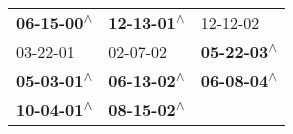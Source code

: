 \begin{supertabular}{lll}
 \textbf{06-15-00\textsuperscript{$\wedge$}} &  \textbf{12-13-01\textsuperscript{$\wedge$}} &                   12-12-02\textsuperscript{} \\
                  03-22-01\textsuperscript{} &                   02-07-02\textsuperscript{} &  \textbf{05-22-03\textsuperscript{$\wedge$}} \\
 \textbf{05-03-01\textsuperscript{$\wedge$}} &  \textbf{06-13-02\textsuperscript{$\wedge$}} &  \textbf{06-08-04\textsuperscript{$\wedge$}} \\
 \textbf{10-04-01\textsuperscript{$\wedge$}} &  \textbf{08-15-02\textsuperscript{$\wedge$}} &                                              \\
\end{supertabular}
